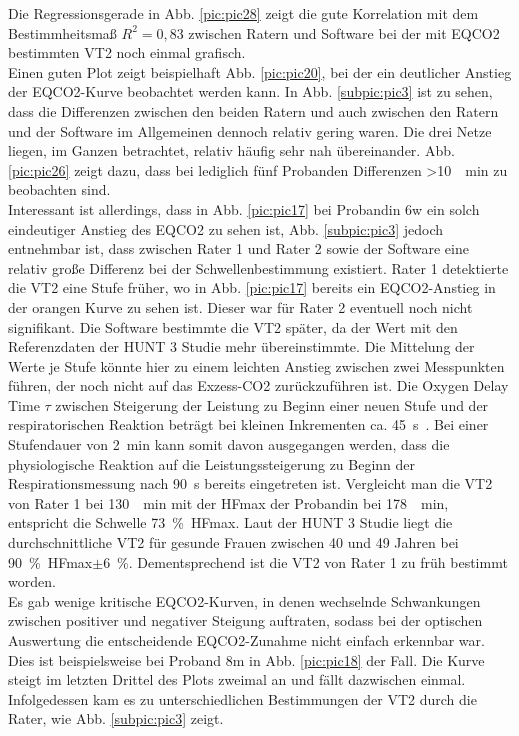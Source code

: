 %
Die Regressionsgerade in Abb. \ref{pic:pic28} zeigt die gute Korrelation mit dem Bestimmheitsmaß $R^2 = 0,83$ zwischen Ratern und Software bei der mit \acs{EQCO2} bestimmten VT2 noch einmal grafisch.\\
Einen guten Plot zeigt beispielhaft Abb. \ref{pic:pic20}, bei der ein deutlicher Anstieg der \acs{EQCO2}-Kurve beobachtet werden kann. In Abb. \ref{subpic:pic3} ist zu sehen, dass die Differenzen zwischen den beiden Ratern und auch zwischen den Ratern und der Software im Allgemeinen dennoch relativ gering waren. Die drei Netze liegen, im Ganzen betrachtet, relativ häufig sehr nah übereinander. Abb. \ref{pic:pic26} zeigt dazu, dass bei lediglich fünf Probanden Differenzen >\SI{10}{\per\minute} zu beobachten sind.\\
Interessant ist allerdings, dass in Abb. \ref{pic:pic17} bei Probandin 6w ein solch eindeutiger Anstieg des \acs{EQCO2} zu sehen ist, Abb. \ref{subpic:pic3} jedoch entnehmbar ist, dass zwischen Rater 1 und Rater 2 sowie der Software eine relativ große Differenz bei der Schwellenbestimmung existiert. Rater 1 detektierte die VT2 eine Stufe früher, wo in Abb. \ref{pic:pic17} bereits ein \acs{EQCO2}-Anstieg in der orangen Kurve zu sehen ist. Dieser war für Rater 2 eventuell noch nicht signifikant. Die Software bestimmte die VT2 später, da der Wert mit den Referenzdaten der HUNT 3 Studie mehr übereinstimmte. Die Mittelung der Werte je Stufe könnte hier zu einem leichten Anstieg zwischen zwei Messpunkten führen, der noch nicht auf das Exzess-\acs{CO2} zurückzuführen ist. Die Oxygen Delay Time $\tau$ zwischen Steigerung der Leistung zu Beginn einer neuen Stufe und der respiratorischen Reaktion beträgt bei kleinen Inkrementen ca. \SI{45}{\second}~\cite{Kroidl.2015}. Bei einer Stufendauer von \SI{2}{\minute} kann somit davon ausgegangen werden, dass die physiologische Reaktion auf die Leistungssteigerung zu Beginn der Respirationsmessung nach \SI{90}{\second} bereits eingetreten ist. Vergleicht man die VT2 von Rater 1 bei \SI{130}{\per\minute} mit der \acs{HFmax} der Probandin bei \SI{178}{\per\minute}, entspricht die Schwelle 73~\%~\acs{HFmax}. Laut der HUNT 3 Studie liegt die durchschnittliche VT2 für gesunde Frauen zwischen 40 und 49 Jahren bei 90~\%~\acs{HFmax}$\pm$6~\%. Dementsprechend ist die VT2 von Rater 1 zu früh bestimmt worden.\\
Es gab wenige kritische \acs{EQCO2}-Kurven, in denen wechselnde Schwankungen zwischen positiver und negativer Steigung auftraten, sodass bei der optischen Auswertung die entscheidende \acs{EQCO2}-Zunahme nicht einfach erkennbar war. Dies ist beispielsweise bei Proband 8m in Abb. \ref{pic:pic18} der Fall. Die Kurve steigt im letzten Drittel des Plots zweimal an und fällt dazwischen einmal. Infolgedessen kam es zu unterschiedlichen Bestimmungen der VT2 durch die Rater, wie Abb. \ref{subpic:pic3} zeigt.
%
